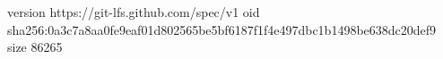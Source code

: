 version https://git-lfs.github.com/spec/v1
oid sha256:0a3c7a8aa0fe9eaf01d802565be5bf6187f1f4e497dbc1b1498be638dc20def9
size 86265
